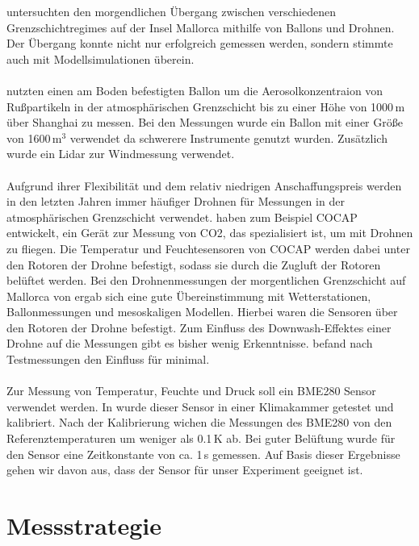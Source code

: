 \documentclass[a4paper,11pt,DIV=calc,tablecaptionabove,headinclude,twoside]{article}
\begin{document}
\citet{jimenez2016morning} untersuchten den morgendlichen Übergang zwischen verschiedenen Grenzschichtregimes auf der Insel Mallorca mithilfe von Ballons und Drohnen. Der Übergang konnte nicht nur erfolgreich gemessen werden, sondern stimmte auch mit Modellsimulationen überein.\\\\ 
\citet{Li2015TetheredBB} nutzten einen am Boden befestigten Ballon um die Aerosolkonzentraion von Rußpartikeln in der atmosphärischen Grenzschicht bis zu einer Höhe von 1000\,m über Shanghai zu messen. Bei den Messungen wurde ein Ballon mit einer Größe von 1600\,m$^{3}$ verwendet da schwerere Instrumente genutzt wurden. Zusätzlich wurde ein Lidar zur Windmessung verwendet. \\\\
Aufgrund ihrer Flexibilität und dem relativ niedrigen Anschaffungspreis werden
in den letzten Jahren immer häufiger Drohnen für Messungen in der atmosphärischen Grenzschicht verwendet. \citet{kunz2018cocap} haben zum Beispiel COCAP entwickelt, ein Gerät zur Messung von CO2, das spezialisiert ist, um mit Drohnen zu fliegen. Die Temperatur und Feuchtesensoren von COCAP werden dabei unter den Rotoren der Drohne befestigt, sodass sie durch die 
Zugluft der Rotoren belüftet werden. Bei den Drohnenmessungen  der morgentlichen Grenzschicht auf Mallorca von \citet{jimenez2016morning} ergab sich eine gute Übereinstimmung mit Wetterstationen, Ballonmessungen und mesoskaligen Modellen. Hierbei waren die Sensoren über den Rotoren
der Drohne befestigt. Zum Einfluss des Downwash-Effektes einer Drohne auf die Messungen gibt es bisher wenig Erkenntnisse. \citet{zhou2017small} befand nach Testmessungen den Einfluss für minimal.\\\\
Zur Messung von Temperatur, Feuchte und Druck soll ein BME280 Sensor verwendet werden. In \citet{otte2018cost} wurde dieser Sensor in einer Klimakammer getestet und kalibriert. Nach der Kalibrierung wichen die Messungen des BME280 von den Referenztemperaturen um weniger als 0.1\,K ab. Bei guter Belüftung wurde für den Sensor eine Zeitkonstante von ca. 1\,s gemessen. Auf Basis dieser Ergebnisse gehen wir davon aus, dass der Sensor für unser Experiment geeignet ist.  

\section{Messstrategie}
\end{document}
